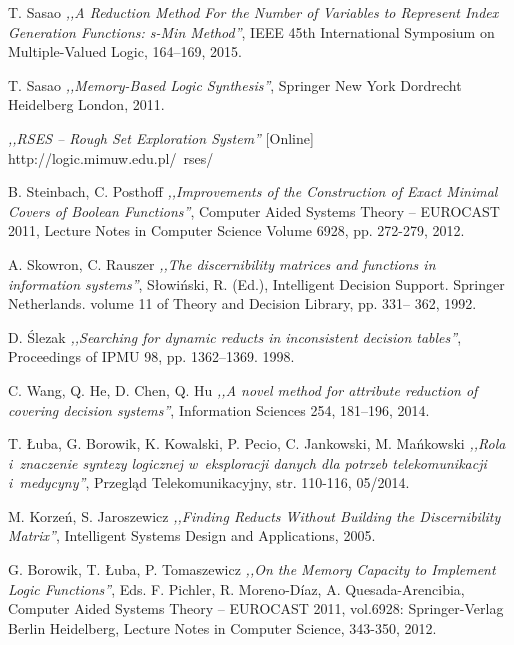 \begin{thebibliography}{99}
 T. Sasao \emph{,,A Reduction Method For the Number of Variables to Represent Index Generation Functions: s-Min Method''}, IEEE 45th International Symposium on Multiple-Valued Logic, 164–169, 2015.

 T. Sasao \emph{,,Memory-Based Logic Synthesis''}, Springer New York Dordrecht Heidelberg London, 2011.

 \emph{,,RSES – Rough Set Exploration System''} [Online] http://logic.mimuw.edu.pl/~rses/

 B. Steinbach, C. Posthoff \emph{,,Improvements of the Construction of Exact Minimal Covers of Boolean Functions''}, Computer Aided Systems Theory – EUROCAST 2011, Lecture Notes in Computer Science Volume 6928, pp. 272-279, 2012.

 A. Skowron, C. Rauszer \emph{,,The discernibility matrices and functions in information systems''}, Słowiński, R. (Ed.), Intelligent Decision Support. Springer Netherlands. volume 11 of Theory and Decision Library, pp. 331– 362, 1992.

 D. Ślezak \emph{,,Searching for dynamic reducts in inconsistent decision tables''}, Proceedings of IPMU 98, pp. 1362–1369. 1998.

 C. Wang, Q. He, D. Chen, Q. Hu \emph{,,A novel method for attribute reduction of covering decision systems''}, Information Sciences 254, 181–196, 2014.

 T. Łuba, G. Borowik, K. Kowalski, P. Pecio, C. Jankowski, M. Mańkowski \emph{,,Rola i~znaczenie syntezy logicznej w~eksploracji danych dla potrzeb telekomunikacji i~medycyny''}, Przegląd Telekomunikacyjny, str. 110-116, 05/2014.

 M. Korzeń, S. Jaroszewicz \emph{,,Finding Reducts Without Building the Discernibility Matrix''}, Intelligent Systems Design and Applications, 2005.

 G. Borowik, T. Łuba, P. Tomaszewicz \emph{,,On the Memory Capacity to Implement Logic Functions''}, Eds. F. Pichler, R. Moreno-Díaz, A. Quesada-Arencibia, Computer Aided Systems Theory – EUROCAST 2011, vol.6928: Springer-Verlag Berlin Heidelberg, Lecture Notes in Computer Science, 343-350, 2012.


\end{thebibliography}

